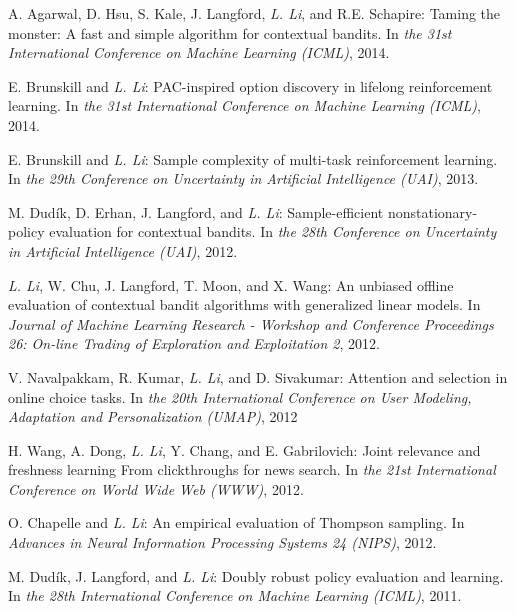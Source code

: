 \documentclass[10pt,twoside,letterpaper]{article}
\newcommand{\selffont}[1]{{\textit{#1}}}
\newcommand{\venuefont}[1]{{\textit{#1}}}
\newcommand{\myself}{\selffont{L. Li}}
\begin{document}
\begin{compactenum}[(C1)]
\item{A. Agarwal, D. Hsu, S. Kale, J. Langford, \myself, and R.E. Schapire: Taming the monster: A fast and simple algorithm for contextual bandits.  In \venuefont{the 31st International Conference on Machine Learning (ICML)}, 2014.}

\item{E. Brunskill and \myself: PAC-inspired option discovery in lifelong reinforcement learning.  In \venuefont{the 31st International Conference on Machine Learning (ICML)}, 2014.}

\item{E. Brunskill and \myself: Sample complexity of multi-task reinforcement learning.  In \venuefont{the 29th Conference on Uncertainty in Artificial Intelligence (UAI)}, 2013.}

\item{M. Dud\'ik, D. Erhan, J. Langford, and \myself: Sample-efficient nonstationary-policy evaluation for contextual bandits.  In \venuefont{the 28th Conference on Uncertainty in Artificial Intelligence (UAI)}, 2012.}

\item{\myself, W. Chu, J. Langford, T. Moon, and X. Wang: An unbiased offline evaluation of contextual bandit algorithms with generalized linear models.  In \venuefont{Journal of Machine Learning Research - Workshop and Conference Proceedings 26: On-line Trading of Exploration and Exploitation 2}, 2012.}

\item{V. Navalpakkam, R. Kumar, \myself, and D. Sivakumar: Attention and selection in online choice tasks.  In \venuefont{the 20th International Conference on User Modeling, Adaptation and Personalization (UMAP)}, 2012}

\item{H. Wang, A. Dong, \myself, Y. Chang, and E. Gabrilovich: Joint relevance and freshness learning From clickthroughs for news search.  In \venuefont{the 21st International Conference on World Wide Web (WWW)}, 2012.}

\item{O. Chapelle and \myself: An empirical evaluation of Thompson sampling.  In \venuefont{Advances in Neural Information Processing Systems 24 (NIPS)}, 2012.}

\item{M. Dud\'ik, J. Langford, and \myself: Doubly robust policy evaluation and learning.  In \venuefont{the 28th International Conference on Machine
Learning (ICML)}, 2011.}


\end{compactenum}
\end{document}
